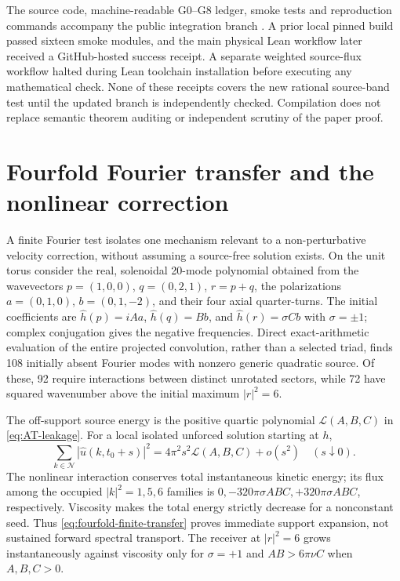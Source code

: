 \documentclass[11pt,a4paper]{article}
\theoremstyle{plain}
\theoremstyle{definition}
\begin{document}
The source code, machine-readable G0--G8 ledger, smoke tests and
reproduction commands accompany the public integration branch
\cite{NewtonRepo2026}. A prior local pinned build passed sixteen smoke
modules, and the main physical Lean workflow later received a
GitHub-hosted success receipt. A separate weighted source-flux workflow
halted during Lean toolchain installation before executing any
mathematical check. None of these receipts covers the new rational
source-band test until the updated branch is independently checked.
Compilation does not replace semantic theorem auditing or independent
scrutiny of the paper proof.

\section{Fourfold Fourier transfer and the nonlinear correction}

A finite Fourier test isolates one mechanism relevant to a
non-perturbative velocity correction, without assuming a source-free
solution exists. On the unit torus consider the real, solenoidal
20-mode polynomial obtained from the wavevectors
$p=(1,0,0)$, $q=(0,2,1)$, $r=p+q$, the polarizations
$a=(0,1,0)$, $b=(0,1,-2)$, and their four axial quarter-turns.
The initial coefficients are
$\widehat h(p)=iAa$, $\widehat h(q)=Bb$, and
$\widehat h(r)=\sigma Cb$ with $\sigma=\pm1$; complex conjugation
gives the negative frequencies. Direct exact-arithmetic evaluation
of the entire projected convolution, rather than a selected
triad, finds 108 initially absent Fourier modes with nonzero
generic quadratic source. Of these, 92 require interactions
between distinct unrotated sectors, while 72 have squared
wavenumber above the initial maximum $|r|^2=6$.

The off-support source energy is the positive quartic polynomial
$\mathcal L(A,B,C)$ in \eqref{eq:AT-leakage}. For a local
isolated unforced solution starting at $h$,
\begin{equation}\label{eq:fourfold-finite-transfer}
 \sum_{k\in\mathcal N}|\widehat u(k,t_0+s)|^2
 =4\pi^2s^2\mathcal L(A,B,C)+o(s^2)
 \quad(s\downarrow0).
\end{equation}
The nonlinear interaction conserves total instantaneous kinetic
energy; its flux among the occupied $|k|^2=1,5,6$ families is
$0,-320\pi\sigma ABC,+320\pi\sigma ABC$, respectively.
Viscosity makes the total energy strictly decrease for a
nonconstant seed. Thus \eqref{eq:fourfold-finite-transfer}
proves immediate support expansion, not sustained forward
spectral transport. The receiver at $|r|^2=6$ grows
instantaneously against viscosity only for $\sigma=+1$ and
$AB>6\pi\nu C$ when $A,B,C>0$.
\end{document}
